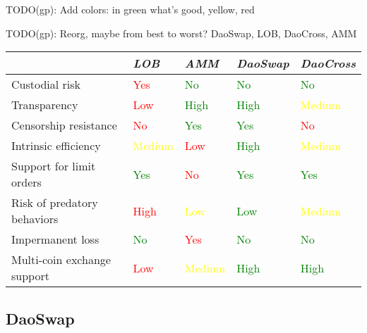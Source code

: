 \documentclass[11pt, reqno]{amsart}
\theoremstyle{definition}
\theoremstyle{remark}
\begin{document}
TODO(gp): Add colors: in green what's good, yellow, red

TODO(gp): Reorg, maybe from best to worst? DaoSwap, LOB, DaoCross, AMM

\begin{samepage}
	\begin{table}[h!]
		\centering
		\begin{tabular}{lllll}
			                            & \emph{LOB} & \emph{AMM} & \emph{DaoSwap} & \emph{DaoCross} \\
			\hline
            Custodial risk              & \textcolor{red}{Yes}        & \textcolor{green}{No} & \textcolor{green}{No} & \textcolor{green}{No}  \\
            Transparency                & \textcolor{red}{Low}        & \textcolor{green}{High}       & \textcolor{green}{High}           & \textcolor{yellow}{Medium} \\
            Censorship resistance       & \textcolor{red}{No}         & \textcolor{green}{Yes} & \textcolor{green}{Yes} & \textcolor{red}{No} \\
            Intrinsic efficiency        & \textcolor{yellow}{Medium}     & \textcolor{red}{Low}        & \textcolor{green}{High} & \textcolor{yellow}{Medium}          \\
            Support for limit orders    & \textcolor{green}{Yes} & \textcolor{red}{No} & \textcolor{green}{Yes}            & \textcolor{green}{Yes} \\
            Risk of predatory behaviors & \textcolor{red}{High} & \textcolor{yellow}{Low} & \textcolor{green}{Low}       & \textcolor{yellow}{Medium} \\
            Impermanent loss            & \textcolor{green}{No}         & \textcolor{red}{Yes} & \textcolor{green}{No}             & \textcolor{green}{No}              \\
            Multi-coin exchange support & \textcolor{red}{Low} & \textcolor{yellow}{Medium} & \textcolor{green}{High} & \textcolor{green}{High} \\
			\hline
		\end{tabular}
	\end{table}
\end{samepage}

\subsection{DaoSwap}
\end{document}
